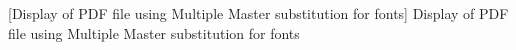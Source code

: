[Display of PDF file using Multiple Master substitution for fonts]{%
 Display of PDF file using Multiple Master substitution for fonts
}%
